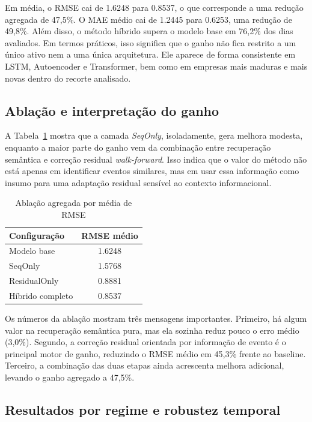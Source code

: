 \documentclass[12pt]{article}
\begin{document}
Em média, o RMSE cai de 1.6248 para 0.8537, o que corresponde a uma redução agregada de 47,5\%. O MAE médio cai de 1.2445 para 0.6253, uma redução de 49,8\%. Além disso, o método híbrido supera o modelo base em 76,2\% dos dias avaliados. Em termos práticos, isso significa que o ganho não fica restrito a um único ativo nem a uma única arquitetura. Ele aparece de forma consistente em LSTM, Autoencoder e Transformer, bem como em empresas mais maduras e mais novas dentro do recorte analisado.

\subsection{Ablação e interpretação do ganho}

A Tabela~\ref{tab:ablacao} mostra que a camada \textit{SeqOnly}, isoladamente, gera melhora modesta, enquanto a maior parte do ganho vem da combinação entre recuperação semântica e correção residual \textit{walk-forward}. Isso indica que o valor do método não está apenas em identificar eventos similares, mas em usar essa informação como insumo para uma adaptação residual sensível ao contexto informacional.

\begin{table}[H]
\centering
\caption{Ablação agregada por média de RMSE}
\label{tab:ablacao}
\begin{tabular}{l c}
\toprule
\textbf{Configuração} & \textbf{RMSE médio} \\
\midrule
Modelo base      & 1.6248 \\
SeqOnly          & 1.5768 \\
ResidualOnly     & 0.8881 \\
Híbrido completo & 0.8537 \\
\bottomrule
\end{tabular}
\end{table}

Os números da ablação mostram três mensagens importantes. Primeiro, há algum valor na recuperação semântica pura, mas ela sozinha reduz pouco o erro médio (3,0\%). Segundo, a correção residual orientada por informação de evento é o principal motor de ganho, reduzindo o RMSE médio em 45,3\% frente ao baseline. Terceiro, a combinação das duas etapas ainda acrescenta melhora adicional, levando o ganho agregado a 47,5\%.

\subsection{Resultados por regime e robustez temporal}
\end{document}
